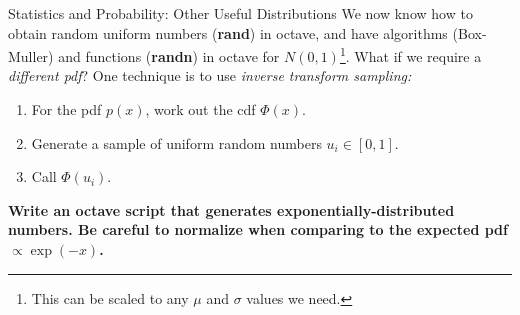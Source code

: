 \documentclass{beamer}
\begin{document}
\begin{frame}[fragile]{Statistics and Probability: Other Useful Distributions}
\small
We now know how to obtain random uniform numbers (\textbf{rand}) in octave, and have algorithms (Box-Muller) and functions (\textbf{randn}) in octave for $N(0,1)$\footnote{This can be scaled to any $\mu$ and $\sigma$ values we need.}.  What if we require a \textit{different pdf}?  One technique is to use \textit{inverse transform sampling:}
\begin{enumerate}
\item For the pdf $p(x)$, work out the cdf $\Phi(x)$.
\item Generate a sample of uniform random numbers $u_i \in [0,1]$.
\item Call $\Phi(u_i)$.
\end{enumerate}
\textbf{Write an octave script that generates exponentially-distributed numbers.  Be careful to normalize when comparing to the expected pdf $\propto \exp(-x)$.}
\end{frame}
\end{document}
